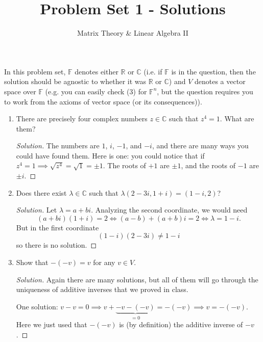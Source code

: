\documentclass[a4paper,11pt]{article}
\title{Problem Set 1 - Solutions}
\author{Matrix Theory \& Linear Algebra II}
\date{}
\theoremstyle{definition}
\newenvironment{solution}
  {\renewcommand\qedsymbol{$\blacksquare$}\begin{proof}[Solution]}
  {\end{proof}}
\begin{document}
\maketitle
\thispagestyle{empty}

\noindent
In this problem set, $\mathbb F$ denotes either $\mathbb R$ or $\mathbb C$ (i.e. if $\mathbb F$ is in the question, then the solution should be agnostic to whether it was $\mathbb R$ or $\mathbb C$) and $V$ denotes a vector space over $\mathbb F$ (e.g. you can easily check (3) for $\mathbb F^n$, but the question requires you to work from the axioms of vector space (or its consequences)).

\begin{enumerate}[(1)]
\item
There are precisely four complex numbers $z\in\mathbb C$ such that $z^4 = 1$.
What are them?

\begin{solution}
The numbers are $1$, $i$, $-1$, and $-i$, and there are many ways you could have found them.
Here is one: you could notice that if $z^4 = 1\implies \sqrt{z^4} = \sqrt{1} = \pm 1$.
The roots of $+1$ are $\pm 1$, and the roots of $-1$ are $\pm i$.
\end{solution}

\item 
Does there exist $\lambda\in\mathbb C$ such that $
\lambda(2-3i,1+i) = (1-i,2)$?
\begin{solution}
Let $\lambda = a+bi$.
Analyzing the second coordinate, we would need
\[
(a+bi)(1+i) = 2 \iff (a-b)+(a+b)i = 2 \iff \lambda = 1-i.
\]
But in the first coordinate
\[
(1-i)(2-3i) \neq 1-i
\]
so there is no solution.
\end{solution}
\item
Show that $-(-v)=v$ for any $v\in V$.
\begin{solution}
Again there are many solutions, but all of them will go through the uniqueness of additive inverses that we proved in class.

One solution: $v-v = 0 \implies v+\underbrace{-v-(-v)}_{=0} = -(-v)\implies v = -(-v)$. Here we just used that $-(-v)$ is (by definition) the additive inverse of $-v$.


\end{solution}
\end{enumerate}
\end{document}
